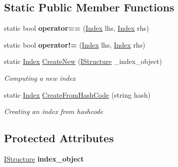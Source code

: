 \subsection*{Static Public Member Functions}
\begin{DoxyCompactItemize}
\item 
\hypertarget{class_dwarf_d_b_1_1_data_structures_1_1_index_aa332f812fd66a7516a1749a6c29a04c6}{static bool {\bfseries operator==} (\hyperlink{class_dwarf_d_b_1_1_data_structures_1_1_index}{Index} lhs, \hyperlink{class_dwarf_d_b_1_1_data_structures_1_1_index}{Index} rhs)}\label{class_dwarf_d_b_1_1_data_structures_1_1_index_aa332f812fd66a7516a1749a6c29a04c6}

\item 
\hypertarget{class_dwarf_d_b_1_1_data_structures_1_1_index_a58d657c3d8d9fd9d122d59bf55008495}{static bool {\bfseries operator!=} (\hyperlink{class_dwarf_d_b_1_1_data_structures_1_1_index}{Index} lhs, \hyperlink{class_dwarf_d_b_1_1_data_structures_1_1_index}{Index} rhs)}\label{class_dwarf_d_b_1_1_data_structures_1_1_index_a58d657c3d8d9fd9d122d59bf55008495}

\item 
static \hyperlink{class_dwarf_d_b_1_1_data_structures_1_1_index}{Index} \hyperlink{class_dwarf_d_b_1_1_data_structures_1_1_index_a8e14d93c580e2aadd133afeef416e44a}{Create\+New} (\hyperlink{interface_dwarf_d_b_1_1_data_structures_1_1_i_structure}{I\+Structure} \+\_\+index\+\_\+object)
\begin{DoxyCompactList}\small\item\em Computing a new index \end{DoxyCompactList}\item 
static \hyperlink{class_dwarf_d_b_1_1_data_structures_1_1_index}{Index} \hyperlink{class_dwarf_d_b_1_1_data_structures_1_1_index_affa4776e5dd06a160e8a874b0f64d769}{Create\+From\+Hash\+Code} (string hash)
\begin{DoxyCompactList}\small\item\em Creating an index from hashcode \end{DoxyCompactList}\end{DoxyCompactItemize}
\subsection*{Protected Attributes}
\begin{DoxyCompactItemize}
\item 
\hypertarget{class_dwarf_d_b_1_1_data_structures_1_1_index_a028b92bd2f8012fe81b60d0fbac93044}{\hyperlink{interface_dwarf_d_b_1_1_data_structures_1_1_i_structure}{I\+Structure} {\bfseries index\+\_\+object}}\label{class_dwarf_d_b_1_1_data_structures_1_1_index_a028b92bd2f8012fe81b60d0fbac93044}

\end{DoxyCompactItemize}

